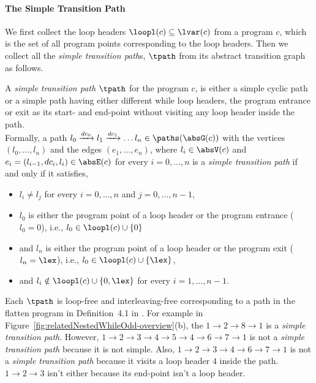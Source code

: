 \paragraph{The Simple Transition Path}
We first collect the loop headers $\loopl(c) \subseteq \lvar(c)$ from a program $c$, which is the set of all program points corresponding to the loop headers.
Then we collect all the \emph{simple transition path}s, $\tpath$ from its abstract transition graph as follows.
\begin{defn}
 \label{def:tpath}
A \emph{simple transition path}
$\tpath$ for the program $c$, is either a simple cyclic path
or a simple path having either different while loop headers, the program entrance or exit as its start- and end-point
without visiting any loop header inside the path.
\\
Formally, a path $l_0 \xrightarrow{dc_0} l_1 \xrightarrow{dc_1} \ldots l_n \in \paths(\absG(c))$ with the
vertices $(l_0, \ldots, l_n)$ and the edges $(e_1, \ldots, e_n)$, where $l_i \in \absV(c)$ and $e_i = (l_{i - 1}, dc_i, l_{i}) \in \absE(c)$ for every $i = 0, \ldots, n$
%
is a \emph{simple transition path} if and only if it satisfies,
\begin{itemize}
 \item $l_i \neq l_j$ for every $i = 0, \ldots, n$ and $j = 0, \ldots, {n - 1}$,
 \item $l_0$ is either the program point of a loop header or the program entrance ($l_0 = 0$),
 i.e., $l_0 \in \loopl(c) \cup \{ 0 \}$
 \item and $l_n$ is either the program point of a loop header or the program exit ($l_n = \lex$),
 i.e., $l_0 \in \loopl(c) \cup \{ \lex \}$,
 \item and $l_i \notin \loopl(c) \cup \{ 0, \lex \}$ for every $i = 1, \ldots, n-1$.
\end{itemize}
\end{defn}
Each $\tpath$ is loop-free and interleaving-free corresponding to a path in the flatten program in Definition~4.1 in \cite{GulwaniJK09}.
For example in Figure~\ref{fig:relatedNestedWhileOdd-overview}(b), the $1 \to 2 \to 8 \to 1$ is a \emph{simple transition path}.
However, $1 \to 2 \to 3 \to 4 \to 5 \to 4 \to 6 \to 7 \to 1$ is not a \emph{simple transition path} because it is not simple.
Also, $1 \to 2 \to 3 \to 4 \to 6 \to 7 \to 1$ is not a \emph{simple transition path} because it visits a loop header $4$ inside the path. $1 \to 2 \to 3$ isn't either because its end-point isn't a loop header.


